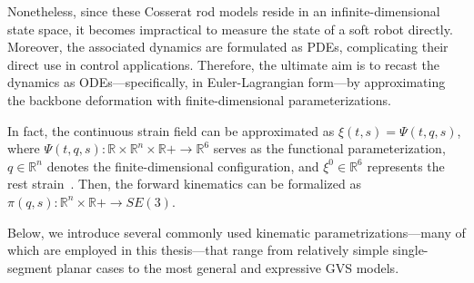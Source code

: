 Nonetheless, since these Cosserat rod models reside in an infinite-dimensional state space, it becomes impractical to measure the state of a soft robot directly. Moreover, the associated dynamics are formulated as \glspl{PDE}, complicating their direct use in control applications. Therefore, the ultimate aim is to recast the dynamics as \glspl{ODE}—specifically, in Euler-Lagrangian form—by approximating the backbone deformation with finite-dimensional parameterizations.

In fact, the continuous strain field can be approximated as $\xi(t,s) = \Psi(t,q,s)$,
where $\Psi(t,q,s): \mathbb{R} \times \mathbb{R}^n \times \mathbb{R}+ \to \mathbb{R}^6$ serves as the functional parameterization, $q \in \mathbb{R}^n$ denotes the finite-dimensional configuration, and $\xi^0 \in \mathbb{R}^6$ represents the rest strain~\citep{mathew2025reduced}. Then, the forward kinematics can be formalized as
$\pi(q,s): \mathbb{R}^n \times \mathbb{R}+ \to SE(3)$.

Below, we introduce several commonly used kinematic parametrizations—many of which are employed in this thesis—that range from relatively simple single-segment planar cases to the most general and expressive \gls{GVS} models.

